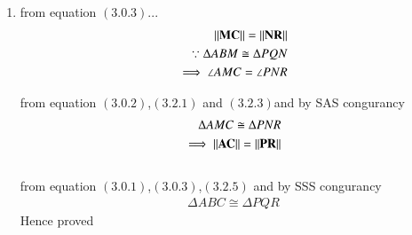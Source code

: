 \begin{enumerate}[label=\thesection.\arabic*.,ref=\thesection.\theenumi]
	
\item
from equation $\left(3.0.3\right)$...
\begin{align}
\left\lVert\mathbf{MC}\right\rVert = \left\lVert\mathbf{NR}\right\rVert
\\
\because \Delta ABM \cong \Delta PQN 
\\
\implies \angle AMC = \angle PNR
\end{align}


from equation $\left(3.0.2\right)$,$\left(3.2.1\right)$ and $\left(3.2.3\right)$and by SAS congurancy 
\begin{align}
\Delta AMC \cong \Delta PNR
\\
\implies \left\lVert\mathbf{AC}\right\rVert = \left\lVert\mathbf{PR}\right\rVert
\end{align}
\\
	from equation $\left(3.0.1\right)$,$\left(3.0.3\right)$,$\left(3.2.5\right)$ and  by SSS congurancy
\begin{align}
\Delta ABC \cong \Delta PQR
\end{align}
\centering Hence proved

\end{enumerate}

